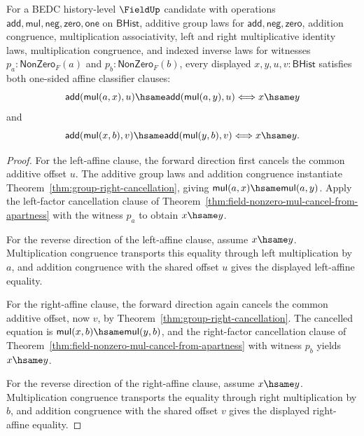 \begin{theorem}
\label{thm:field-affine-one-sided-map-classifier-exact-from-apartness}
For a BEDC history-level $\FieldUp$ candidate with operations
$\mathsf{add},\mathsf{mul},\mathsf{neg},\mathsf{zero},\mathsf{one}$ on
$\mathsf{BHist}$, additive group laws for
$\mathsf{add},\mathsf{neg},\mathsf{zero}$, addition congruence,
multiplication associativity, left and right multiplicative identity laws,
multiplication congruence, and indexed inverse laws for witnesses
$p_a:\mathsf{NonZero}_F(a)$ and $p_b:\mathsf{NonZero}_F(b)$, every displayed
$x,y,u,v:\mathsf{BHist}$ satisfies both one-sided affine classifier clauses:
$$
\mathsf{add}(\mathsf{mul}(a,x),u)\hsame
\mathsf{add}(\mathsf{mul}(a,y),u)
\Longleftrightarrow
x\hsame y
$$
and
$$
\mathsf{add}(\mathsf{mul}(x,b),v)\hsame
\mathsf{add}(\mathsf{mul}(y,b),v)
\Longleftrightarrow
x\hsame y.
$$
\end{theorem}
\begin{proof}
For the left-affine clause, the forward direction first cancels the common
additive offset $u$. The additive group laws and addition congruence instantiate
Theorem~\ref{thm:group-right-cancellation}, giving
$\mathsf{mul}(a,x)\hsame\mathsf{mul}(a,y)$. Apply the left-factor cancellation
clause of Theorem~\ref{thm:field-nonzero-mul-cancel-from-apartness} with the
witness $p_a$ to obtain $x\hsame y$.

For the reverse direction of the left-affine clause, assume $x\hsame y$.
Multiplication congruence transports this equality through left multiplication
by $a$, and addition congruence with the shared offset $u$ gives the displayed
left-affine equality.

For the right-affine clause, the forward direction again cancels the common
additive offset, now $v$, by Theorem~\ref{thm:group-right-cancellation}. The
cancelled equation is $\mathsf{mul}(x,b)\hsame\mathsf{mul}(y,b)$, and the right-factor
cancellation clause of Theorem~\ref{thm:field-nonzero-mul-cancel-from-apartness}
with witness $p_b$ yields $x\hsame y$.

For the reverse direction of the right-affine clause, assume $x\hsame y$.
Multiplication congruence transports the equality through right multiplication
by $b$, and addition congruence with the shared offset $v$ gives the displayed
right-affine equality.
\end{proof}

